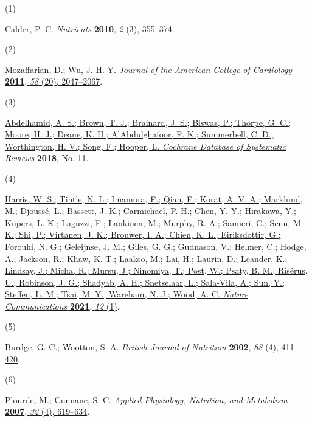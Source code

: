 \documentclass[journal=jacsat,manuscript=article]{achemso}
\newlength{\cslhangindent}
\newlength{\csllabelwidth}
\newenvironment{CSLReferences}[2] %
 {\begin{list}{}{%
  \setlength{\itemindent}{0pt}
  \setlength{\leftmargin}{0pt}
  \setlength{\parsep}{0pt}
  \ifodd #1
   \setlength{\leftmargin}{\cslhangindent}
   \setlength{\itemindent}{-1\cslhangindent}
  \fi
  \setlength{\itemsep}{#2\baselineskip}}}
 {\end{list}}
\newcommand{\CSLLeftMargin}[1]{\parbox[t]{\csllabelwidth}{#1}}
\newcommand{\CSLRightInline}[1]{\parbox[t]{\linewidth - \csllabelwidth}{#1}\break}
\begin{document}
\label{refs}
\begin{CSLReferences}{0}{0}
\CSLLeftMargin{(1) }%
\CSLRightInline{\href{https://doi.org/10.3390/nu2030355}{Calder, P. C.
\emph{Nutrients} \textbf{2010}, \emph{2} (3), 355--374}.}

\CSLLeftMargin{(2) }%
\CSLRightInline{\href{https://doi.org/10.1016/j.jacc.2011.06.063}{Mozaffarian,
D.; Wu, J. H. Y. \emph{Journal of the American College of Cardiology}
\textbf{2011}, \emph{58} (20), 2047--2067}.}

\CSLLeftMargin{(3) }%
\CSLRightInline{\href{https://doi.org/10.1002/14651858.CD003177.pub4}{Abdelhamid,
A. S.; Brown, T. J.; Brainard, J. S.; Biswas, P.; Thorpe, G. C.; Moore,
H. J.; Deane, K. H.; AlAbdulghafoor, F. K.; Summerbell, C. D.;
Worthington, H. V.; Song, F.; Hooper, L. \emph{Cochrane Database of
Systematic Reviews} \textbf{2018}, No. 11}.}

\CSLLeftMargin{(4) }%
\CSLRightInline{\href{https://doi.org/10.1038/s41467-021-22370-2}{Harris,
W. S.; Tintle, N. L.; Imamura, F.; Qian, F.; Korat, A. V. A.; Marklund,
M.; Djoussé, L.; Bassett, J. K.; Carmichael, P. H.; Chen, Y. Y.;
Hirakawa, Y.; Küpers, L. K.; Laguzzi, F.; Lankinen, M.; Murphy, R. A.;
Samieri, C.; Senn, M. K.; Shi, P.; Virtanen, J. K.; Brouwer, I. A.;
Chien, K. L.; Eiriksdottir, G.; Forouhi, N. G.; Geleijnse, J. M.; Giles,
G. G.; Gudnason, V.; Helmer, C.; Hodge, A.; Jackson, R.; Khaw, K. T.;
Laakso, M.; Lai, H.; Laurin, D.; Leander, K.; Lindsay, J.; Micha, R.;
Mursu, J.; Ninomiya, T.; Post, W.; Psaty, B. M.; Risérus, U.; Robinson,
J. G.; Shadyab, A. H.; Snetselaar, L.; Sala-Vila, A.; Sun, Y.; Steffen,
L. M.; Tsai, M. Y.; Wareham, N. J.; Wood, A. C. \emph{Nature
Communications} \textbf{2021}, \emph{12} (1)}.}

\CSLLeftMargin{(5) }%
\CSLRightInline{\href{https://doi.org/10.1079/BJN2002689}{Burdge, G. C.;
Wootton, S. A. \emph{British Journal of Nutrition} \textbf{2002},
\emph{88} (4), 411--420}.}

\CSLLeftMargin{(6) }%
\CSLRightInline{\href{https://doi.org/10.1139/H07-034}{Plourde, M.;
Cunnane, S. C. \emph{Applied Physiology, Nutrition, and Metabolism}
\textbf{2007}, \emph{32} (4), 619--634}.}


\end{CSLReferences}
\end{document}
